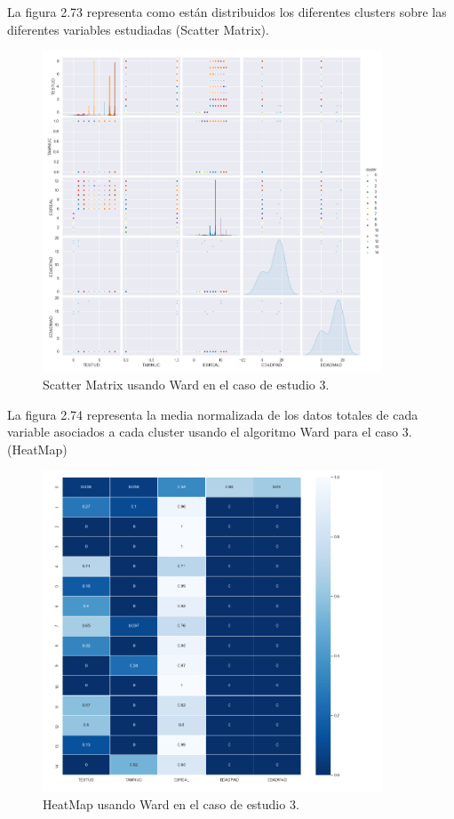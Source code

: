 	La figura 2.73 representa como están distribuidos los diferentes clusters sobre las diferentes variables estudiadas
	(Scatter Matrix).\\

	\begin{figure}[htb]
		\centering
		\includegraphics[width=0.9\textwidth]{./imagenes/caso3/scatterMatrix_caso3_Ward}
		\caption{Scatter Matrix usando Ward en el caso de estudio 3.} \label{fig:1}
	\end{figure}

	La figura 2.74 representa la media normalizada de los datos totales de cada variable asociados
	a cada cluster usando el algoritmo Ward para el caso 3. (HeatMap) \\

	\begin{figure}[htb]
		\centering
		\includegraphics[width=0.9\textwidth]{./imagenes/caso3/heatmap_caso3_Ward}
		\caption{HeatMap usando Ward en el caso de estudio 3.} \label{fig:1}
	\end{figure}

